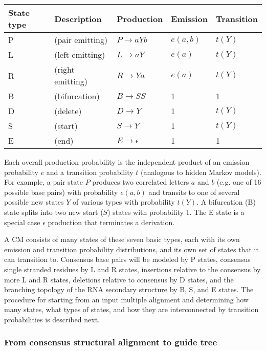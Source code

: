 \documentclass[11pt]{article}
\begin{document}
\vspace{0.5em}
\begin{tabular}{lllll}
State type & Description             &  Production             & Emission & Transition\\ \hline
P & (pair emitting)   & $P \rightarrow a Y b$ & $e(a,b)$ & $t(Y)$  \\
L & (left emitting)   & $L \rightarrow a Y$   & $e(a)$   & $t(Y)$  \\
R & (right emitting)  & $R \rightarrow Y a$   & $e(a)$   & $t(Y)$  \\
B & (bifurcation)     & $B \rightarrow S S$   & 1     &     1     \\
D & (delete)          & $D \rightarrow Y$     & 1     &   $t(Y)$  \\
S & (start)           & $S \rightarrow Y$     &    1     & $t(Y)$  \\
E & (end)             & $E \rightarrow \epsilon$ & 1     &     1     \\
\end{tabular}
\vspace{0.5em}

Each overall production probability is the independent product of an
emission probability $e$ and a transition probability $t$ (analogous
to hidden Markov models). For example, a pair state $P$ produces two
correlated letters $a$ and $b$ (e.g. one of 16 possible base pairs)
with probability $e(a,b)$ and transits to one of several possible new
states $Y$ of various types with probability $t(Y)$.  A bifurcation
(B) state splits into two new start ($S$) states with probability 1.
The E state is a special case $\epsilon$ production that terminates a
derivation.

A CM consists of many states of these seven basic types, each with its
own emission and transition probability distributions, and its own set
of states that it can transition to. Consensus base pairs will be
modeled by P states, consensus single stranded residues by L and
R states, insertions relative to the consensus by more L and R
states, deletions relative to consensus by D states, and the
branching topology of the RNA secondary structure by B, S, and E
states. The procedure for starting from an input multiple alignment
and determining how many states, what types of states, and how they
are interconnected by transition probabilities is described next.

\subsubsection{From consensus structural alignment to guide tree}
\end{document}
